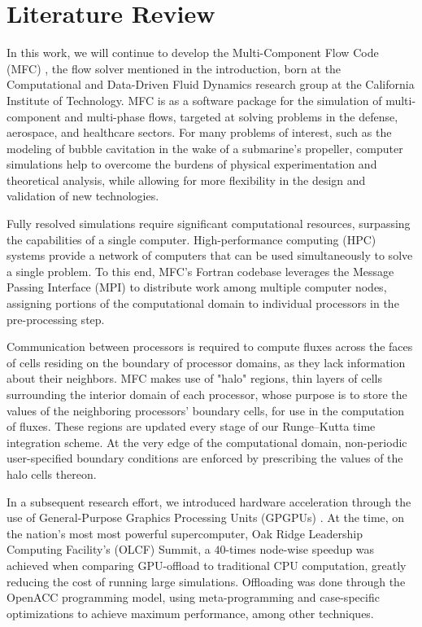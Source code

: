 \chapter{Literature Review}
\label{ch:lit}

In this work, we will continue to develop the Multi-Component Flow Code (MFC) \cite{Bryngelson_2021},
the flow solver mentioned in the introduction, born at the Computational and Data-Driven
Fluid Dynamics research group at the California Institute of Technology. MFC is as a
software package for the simulation of multi-component
and multi-phase flows, targeted at solving problems in the defense, aerospace, and
healthcare sectors. For many problems of interest, such as the modeling
of bubble cavitation in the wake of a submarine's propeller, computer simulations
help to overcome the burdens of physical experimentation and theoretical analysis, while
allowing for more flexibility in the design and validation of new technologies.

Fully resolved simulations require significant computational resources, surpassing
the capabilities of a single computer. High-performance computing (HPC) systems
provide a network of computers that can be used simultaneously to solve a single
problem. To this end, MFC's Fortran codebase leverages the Message Passing Interface (MPI) to
distribute work among multiple computer nodes, assigning portions of the computational
domain to individual processors in the pre-processing step.

Communication between processors
is required to compute fluxes across the faces of cells residing on the boundary
of processor domains, as they lack information about their neighbors.
MFC makes use of "halo" regions, thin layers of cells surrounding the
interior domain of each processor, whose purpose is to store the values of the neighboring
processors' boundary cells, for use in the computation of fluxes. These regions
are updated every stage of our Runge--Kutta time integration scheme. At the very edge
of the computational domain, non-periodic user-specified boundary conditions are
enforced by prescribing the values of the halo cells thereon.

In a subsequent
research effort, we introduced hardware acceleration through the use of General-Purpose
Graphics Processing Units (GPGPUs) \cite{radhakrishnan2024method}. At the time, on the nation's
most most powerful supercomputer, Oak Ridge Leadership Computing Facility's (OLCF) Summit,
a $40$-times node-wise speedup was achieved when comparing GPU-offload to traditional
CPU computation, greatly reducing the cost of running large simulations.
Offloading was done through the OpenACC programming model, using meta-programming
and case-specific optimizations to achieve maximum performance, among other techniques.

